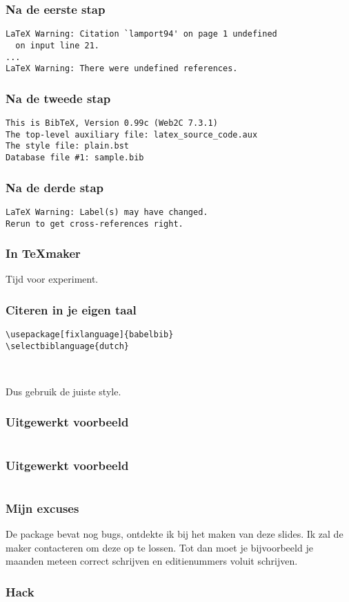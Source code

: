 \begin{frame}[fragile]
  \frametitle{Na de eerste stap}
  \begin{verbatim}
LaTeX Warning: Citation `lamport94' on page 1 undefined
  on input line 21.
...
LaTeX Warning: There were undefined references.\end{verbatim}
\end{frame}

\begin{frame}[fragile]
  \frametitle{Na de tweede stap}
  \begin{verbatim}
This is BibTeX, Version 0.99c (Web2C 7.3.1)
The top-level auxiliary file: latex_source_code.aux
The style file: plain.bst
Database file #1: sample.bib\end{verbatim}
\end{frame}

\begin{frame}[fragile]
  \frametitle{Na de derde stap}
  \begin{verbatim}
LaTeX Warning: Label(s) may have changed.
Rerun to get cross-references right. 
  \end{verbatim}
\end{frame}

\begin{frame}
  \frametitle{In \TeX maker}

  Tijd voor experiment.
\end{frame}

\begin{frame}[fragile]
  \frametitle{Citeren in je eigen taal}

  \begin{verbatim}
\usepackage[fixlanguage]{babelbib}
\selectbiblanguage{dutch}



  \end{verbatim}
  Dus gebruik de juiste style.
\end{frame}

\begin{frame}[fragile]
  \frametitle{Uitgewerkt voorbeeld}

  \footnotesize
  \inputminted{tex}{bib-example.tex}
\end{frame}

\begin{frame}[fragile]
  \frametitle{Uitgewerkt voorbeeld}

  \inputminted{tex}{bib-example.bib}
\end{frame}

\begin{frame}[fragile]
  \frametitle{Mijn excuses}

  De package  bevat nog bugs, ontdekte ik bij het maken van deze slides. Ik zal de maker contacteren om deze op te lossen. Tot dan moet je bijvoorbeeld je maanden meteen correct schrijven en editienummers voluit schrijven.
\end{frame}


\begin{frame}[fragile]
  \frametitle{Hack}

  \inputminted[firstline=9,lastline=19]{tex}{bib-example-extended.tex}
\end{frame}
